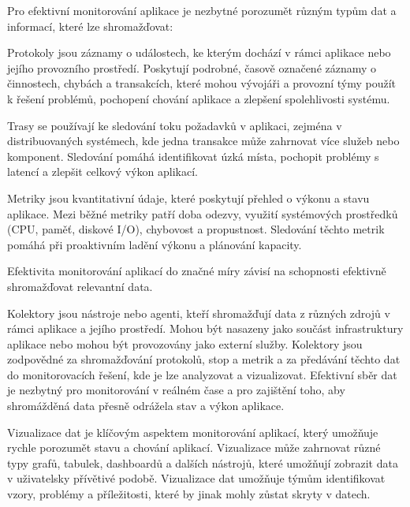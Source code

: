 
Pro efektivní monitorování aplikace je nezbytné porozumět různým typům dat a informací, které lze shromažďovat:


Protokoly jsou záznamy o událostech, ke kterým dochází v rámci aplikace nebo jejího provozního prostředí. Poskytují podrobné, časově označené záznamy o činnostech, chybách a transakcích, které mohou vývojáři a provozní týmy použít k řešení problémů, pochopení chování aplikace a zlepšení spolehlivosti systému.


Trasy se používají ke sledování toku požadavků v aplikaci, zejména v distribuovaných systémech, kde jedna transakce může zahrnovat více služeb nebo komponent. Sledování pomáhá identifikovat úzká místa, pochopit problémy s latencí a zlepšit celkový výkon aplikací.


Metriky jsou kvantitativní údaje, které poskytují přehled o výkonu a stavu aplikace. Mezi běžné metriky patří doba odezvy, využití systémových prostředků (CPU, paměť, diskové I/O), chybovost a propustnost. Sledování těchto metrik pomáhá při proaktivním ladění výkonu a plánování kapacity.


Efektivita monitorování aplikací do značné míry závisí na schopnosti efektivně shromažďovat relevantní data.


Kolektory jsou nástroje nebo agenti, kteří shromažďují data z různých zdrojů v rámci aplikace a jejího prostředí. Mohou být nasazeny jako součást infrastruktury aplikace nebo mohou být provozovány jako externí služby. Kolektory jsou zodpovědné za shromažďování protokolů, stop a metrik a za předávání těchto dat do monitorovacích řešení, kde je lze analyzovat a vizualizovat. Efektivní sběr dat je nezbytný pro monitorování v reálném čase a pro zajištění toho, aby shromážděná data přesně odrážela stav a výkon aplikace.


Vizualizace dat je klíčovým aspektem monitorování aplikací, který umožňuje rychle porozumět stavu a chování aplikací. Vizualizace může zahrnovat různé typy grafů, tabulek, dashboardů a dalších nástrojů, které umožňují zobrazit data v uživatelsky přívětivé podobě. Vizualizace dat umožňuje týmům identifikovat vzory, problémy a příležitosti, které by jinak mohly zůstat skryty v datech.

